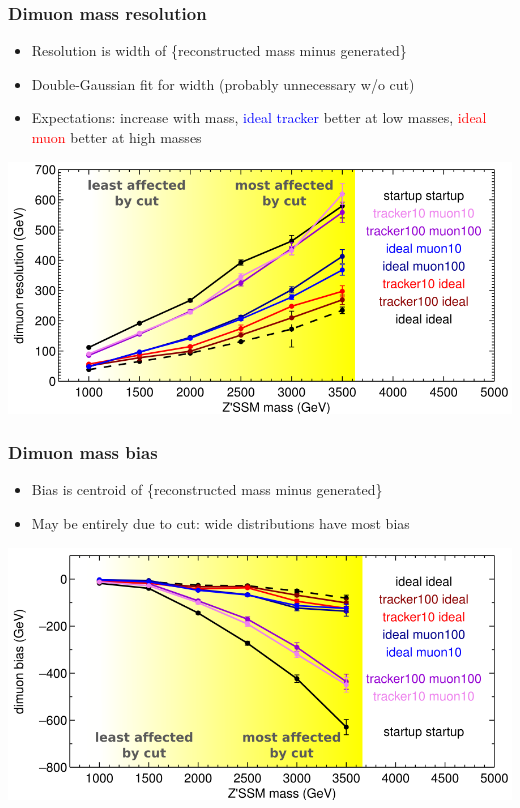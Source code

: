 \documentclass[compress]{beamer}
\begin{document}
\begin{frame}
\frametitle{Dimuon mass resolution}
\begin{itemize}
\item Resolution is width of \{reconstructed mass minus generated\}
\item Double-Gaussian fit for width (probably unnecessary w/o cut)
\item Expectations: increase with mass, \textcolor{blue}{ideal
tracker} better at low masses, \textcolor{red}{ideal muon} better at
high masses
\end{itemize}
\includegraphics[width=\linewidth]{zssm_widths.png}
\end{frame}

\begin{frame}
\frametitle{Dimuon mass bias}
\begin{itemize}
\item Bias is centroid of \{reconstructed mass minus generated\}
\item May be entirely due to cut: wide distributions have most bias
\end{itemize}
\includegraphics[width=\linewidth]{zssm_bias.png}
\end{frame}
\end{document}
